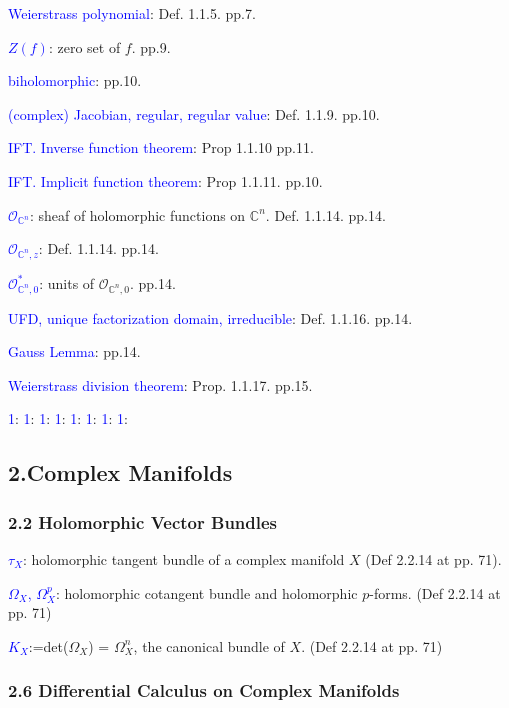 \documentclass{article}
\numberwithin{equation}{subsection} %
\begin{document}
		\textcolor{blue}{Weierstrass polynomial}: Def. 1.1.5. pp.7.
		
		\textcolor{blue}{$Z(f)$}: zero set of $f$. pp.9.
		
		\textcolor{blue}{biholomorphic}: pp.10.
		
		\textcolor{blue}{(complex) Jacobian, regular, regular value}: Def. 1.1.9. pp.10.
		
		\textcolor{blue}{IFT. Inverse function theorem}: Prop 1.1.10 pp.11.
		
		\textcolor{blue}{IFT. Implicit function theorem}: Prop 1.1.11. pp.10.
		
		\textcolor{blue}{$\mathcal{O}_{\mathbb{C}^n}$}:
		sheaf of holomorphic functions on $\mathbb{C}^n$. Def. 1.1.14. pp.14.
		
		\textcolor{blue}{$\mathcal{O}_{\mathbb{C}^n,z}$}: Def. 1.1.14. pp.14.
		
		\textcolor{blue}{$\mathcal{O}^*_{\mathbb{C}^n,0}$}:
		units of $\mathcal{O}_{\mathbb{C}^n,0}$. pp.14.
		
		\textcolor{blue}{UFD, unique factorization domain, irreducible}: 
		Def. 1.1.16. pp.14.
		
		\textcolor{blue}{Gauss Lemma}: pp.14.
		
		\textcolor{blue}{Weierstrass division theorem}: Prop. 1.1.17. pp.15.
		
		\textcolor{blue}{1}: 
		\textcolor{blue}{1}:
		\textcolor{blue}{1}:
		\textcolor{blue}{1}:
		\textcolor{blue}{1}: 
		\textcolor{blue}{1}:
		\textcolor{blue}{1}:
		\textcolor{blue}{1}:

	\subsection{2.Complex Manifolds}

		\subsubsection{2.2 Holomorphic Vector Bundles}

		\textcolor{blue}{$\tau_X$}: holomorphic tangent bundle of a complex manifold $X$ (Def 2.2.14 at pp. 71).
		
		\textcolor{blue}{$\varOmega_X$, $\varOmega^p_X$}: holomorphic cotangent bundle and holomorphic $p$-forms. (Def 2.2.14 at pp. 71)
		
		\textcolor{blue}{$K_X$}:=det($\varOmega_X$) = $\varOmega_X^n$, the canonical bundle of $X$. (Def 2.2.14 at pp. 71)

		\subsubsection{2.6 Differential Calculus on Complex Manifolds}
	
\end{document}

